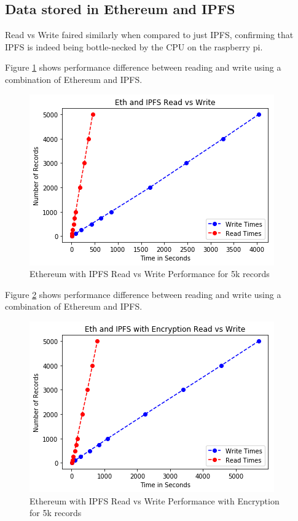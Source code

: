 \documentclass[11pt,openright]{report}
\begin{document}
\subsection{Data stored in Ethereum and IPFS}
Read vs Write faired similarly when compared to just IPFS, confirming that IPFS is indeed being bottle-necked by the CPU on the raspberry pi.

Figure \ref{fig:graph_eth_ipfs_readvwrite} shows performance difference between reading and write using a combination of Ethereum and IPFS.
\newline
\newline
\begin{figure}[!htbp]
    \centering
    \includegraphics[scale=1]{results/graphs/Eth_IPFS_Read_v_Write.png}
    \caption{Ethereum with IPFS Read vs Write Performance for 5k records}
    \label{fig:graph_eth_ipfs_readvwrite}
\end{figure}
\newline
\newline
Figure \ref{fig:graph_eth_ipfs_readvwrite_wencr} shows performance difference between reading and write using a combination of Ethereum and IPFS.
\newline
\newline
\begin{figure}[!htbp]
    \centering
    \includegraphics[scale=1]{results/graphs/Eth_IPFS_Read_v_Write_Encr.png}
    \caption{Ethereum with IPFS Read vs Write Performance with Encryption for 5k records}
    \label{fig:graph_eth_ipfs_readvwrite_wencr}
\end{figure}
\newline
\newline
\end{document}
